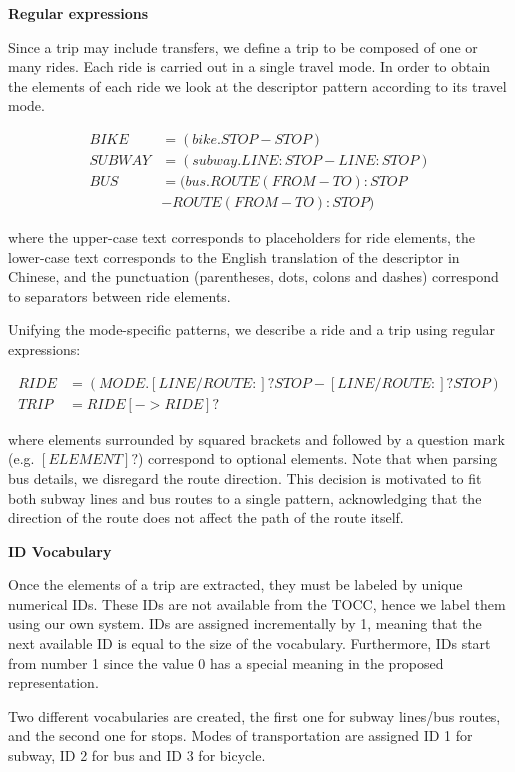 \documentclass{article}
\begin{document}
\textbf{Regular expressions}

Since a trip may include transfers, we define a trip to be composed of one or many rides. Each ride is carried out in a single travel mode. In order to obtain the elements of each ride we look at the descriptor pattern according to its travel mode.

    \begin{align*}
    BIKE &= (bike.STOP-STOP) \\
    SUBWAY &= (subway.LINE:STOP-LINE:STOP) \\
    BUS &= (bus.ROUTE(FROM-TO):STOP \\
    &-ROUTE(FROM-TO):STOP)
	\end{align*}
	
where the upper-case text corresponds to placeholders for ride elements, the lower-case text corresponds to the English translation of the descriptor in Chinese, and the punctuation (parentheses, dots, colons and dashes) correspond to separators between ride elements.

Unifying the mode-specific patterns, we describe a ride and a trip using regular expressions:
    
	\begin{align*}	        
    RIDE &= (MODE.[LINE/ROUTE:]?STOP-[LINE/ROUTE:]?STOP) \\
    TRIP &= RIDE[->RIDE]? 
	\end{align*}    
	
where elements surrounded by squared brackets and followed by a question mark (e.g. $[ELEMENT]?$) correspond to optional elements. Note that when parsing bus details, we disregard the route direction. This decision is motivated to fit both subway lines and bus routes to a single pattern, acknowledging that the direction of the route does not affect the path of the route itself.

\textbf{ID Vocabulary}

Once the elements of a trip are extracted, they must be labeled by unique numerical IDs. These IDs are not available from the TOCC, hence we label them using our own system. IDs are assigned incrementally by 1, meaning that the next available ID is equal to the size of the vocabulary. Furthermore, IDs start from number 1 since the value 0 has a special meaning in the proposed representation.

Two different vocabularies are created, the first one for subway lines/bus routes, and the second one for stops. Modes of transportation are assigned ID 1 for subway, ID 2 for bus and ID 3 for bicycle.
\end{document}
